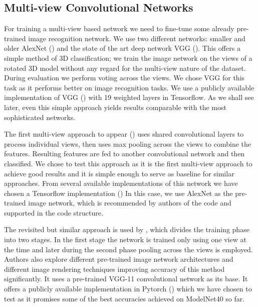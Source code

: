 \subsection{Multi-view Convolutional Networks}
For training a multi-view based network we need to fine-tune some already pre-trained image recognition network. We use two different networks: smaller and older AlexNet (\cite{krizhevsky_imagenet_2012}) and the state of the art deep network VGG (\cite{simonyan_very_2014}). This offers a simple method of 3D classification; we train the image network on the views of a rotated 3D model without any regard for the multi-view nature of the dataset. During evaluation we perform voting across the views. We chose VGG for this task as it performs better on image recognition tasks. We use a publicly available implementation of VGG (\cite{machrisaa_vgg_2017}) with 19 weighted layers in Tensorflow. As we shall see later, even this simple approach yields results comparable with the most sophisticated networks.
\par
The first multi-view approach to appear (\cite{su_multi-view_2015}) uses shared convolutional layers to process individual views, then uses max pooling across the views to combine the features. Resulting features are fed to another convolutional network and then classified. We chose to test this approach as it is the first multi-view approach to achieve good results and it is simple enough to serve as baseline for similar approaches. From several available implementations of this network we have chosen a Tensorflow implementation (\cite{lee_multi-view_2016}) In this case, we use AlexNet as the pre-trained image network, which is recommended by authors of the code and supported in the code structure. 
\par
The revisited but similar approach is used by \cite{su_deeper_2018}, which divides the training phase into two stages. In the first stage the network is trained only using one view at the time and later during the second phase pooling across the views is employed. Authors also explore different pre-trained image network architectures and different image rendering techniques improving accuracy of this method significantly. It uses a pre-trained VGG-11 convolutional network as its base. It offers a publicly available implementation in Pytorch (\cite{su_multi-view_2018}) which we have chosen to test as it promises some of the best accuracies achieved on ModelNet40 so far.



